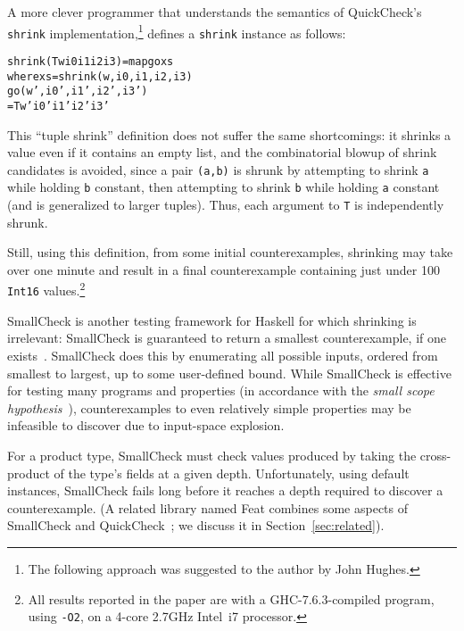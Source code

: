\documentclass{sigplanconf}
\newenvironment{code}{\begin{alltt}\footnotesize}{\end{alltt}}
\newcommand{\ttp}[1]{\texttt{#1}}
\begin{document}
A more clever programmer that understands the semantics of QuickCheck's
\ttp{shrink} implementation,\footnote{The following approach was suggested to
  the author by John Hughes.} defines a \ttp{shrink} instance as follows:
%
\begin{code}
shrink (T w i0 i1 i2 i3) = map go xs
  where xs = shrink (w, i0, i1, i2, i3)
        go (w', i0', i1', i2', i3')
           = T w' i0' i1' i2' i3'
\end{code}
%
\noindent
This ``tuple shrink'' definition does not suffer the same shortcomings: it
shrinks a value even if it contains an empty list, and the combinatorial blowup
of shrink candidates is avoided, since a pair \ttp{(a,b)} is shrunk by
attempting to shrink \ttp{a} while holding \ttp{b} constant, then attempting to
shrink \ttp{b} while holding \ttp{a} constant (and is generalized to larger
tuples).  Thus, each argument to \ttp{T} is independently shrunk.

Still, using this definition, from some initial counterexamples, shrinking may
take over one minute and result in a final counterexample containing just under
100 \ttp{Int16} values.\footnote{All results reported in the paper are with a
  GHC-7.6.3-compiled program, using \ttp{-O2}, on a 4-core 2.7GHz Intel~i7
  processor.}

SmallCheck is another testing framework for Haskell for which shrinking is
irrelevant: SmallCheck is guaranteed to return a smallest counterexample, if
one exists~\cite{sc}.  SmallCheck does this by enumerating all possible inputs,
ordered from smallest to largest, up to some user-defined bound.  While
SmallCheck is effective for testing many programs and properties (in accordance
with the \emph{small scope hypothesis}~\cite{jackson}), counterexamples to even
relatively simple properties may be infeasible to discover due to input-space
explosion.



For a product type, SmallCheck must check values produced by taking the
cross-product of the type's fields at a given depth.  Unfortunately, using
default instances, SmallCheck fails long before it reaches a depth required to
discover a counterexample.  (A related library named Feat combines some aspects
of SmallCheck and QuickCheck~\cite{feat}; we discuss it in
Section~\ref{sec:related}).
\end{document}
